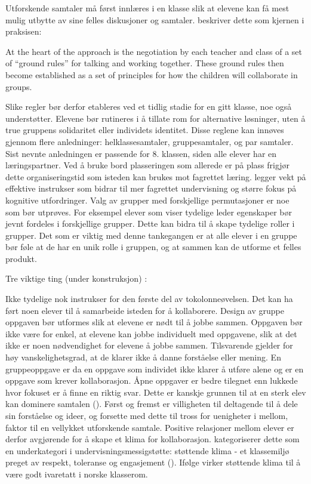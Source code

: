 \documentclass[main.tex]{subfiles}
\begin{document}
Utforskende samtaler må først innlæres i en klasse slik at elevene kan få mest mulig
utbytte av sine felles diskusjoner og samtaler.  beskriver dette som kjernen i 
praksisen:
\begin{displayquote}
At the heart of the approach is the negotiation by each teacher and class of a set of ``ground
rules'' for talking and working together. These ground rules then become established as a set of 
principles for how the children will collaborate in groups.
\end{displayquote}
Slike regler bør derfor etableres ved et tidlig stadie for en gitt klasse, noe 
også understøtter. Elevene bør rutineres i å tillate rom for alternative løsninger, uten å true 
gruppens solidaritet eller individets identitet. Disse reglene kan innøves gjennom flere 
anledninger: helklassesamtaler, gruppesamtaler, og par samtaler. Sist nevnte anledningen er passende
for 8. klassen, siden alle elever har en læringspartner. Ved å bruke bord plasseringen som allerede 
er på plass frigjør dette organiseringstid som isteden kan brukes mot fagrettet læring. 
 legger vekt på effektive instrukser som bidrar til mer fagrettet undervisning og 
større fokus på kognitive utfordringer.
\newline
\newline
Valg av grupper med forskjellige permutasjoner er noe som bør utprøves. For eksempel elever
som viser tydelige leder egenskaper bør jevnt fordeles i forskjellige grupper. Dette kan bidra til
å skape tydelige roller i grupper. Det som er viktig med denne tankegangen er at alle elever
i en gruppe bør føle at de har en unik rolle i gruppen, og at sammen kan de utforme et felles
produkt.

Tre viktige ting (under konstruksjon) : 

Ikke tydelige nok instrukser for den første del av tokolonneøvelsen. 
Det kan ha ført noen elever til å samarbeide isteden for å kollaborere. Design av 
gruppe oppgaven bør utformes slik at elevene er nødt til å jobbe sammen. Oppgaven
bør ikke være for enkel, at elevene kan jobbe individuelt med oppgavene, slik at
det ikke er noen nødvendighet for elevene å jobbe sammen. Tilsvarende gjelder for høy
vanskelighetsgrad, at de klarer ikke å danne forståelse eller mening. En gruppeoppgave
er da en oppgave som individet ikke klarer å utføre alene og er en oppgave som krever
kollaborasjon.  Åpne oppgaver er bedre tilegnet enn lukkede hvor fokuset er å finne 
en riktig svar. Dette er kanskje grunnen til at en sterk elev kan dominere samtalen 
(). Først og fremst er villigheten til deltagende til å dele
sin forståelse og ideer, og forsette med dette til tross for uenigheter i mellom,
faktor til en vellykket utforskende samtale. Positive relasjoner mellom elever
er derfor avgjørende for å skape et klima for kollaborasjon. 
kategoriserer dette som en underkategori i undervisningsmessigstøtte: støttende
klima - et klassemiljø preget av respekt, toleranse og engasjement (). 
Ifølge  virker støttende klima til å være godt 
ivaretatt i norske klasserom.
\end{document}
